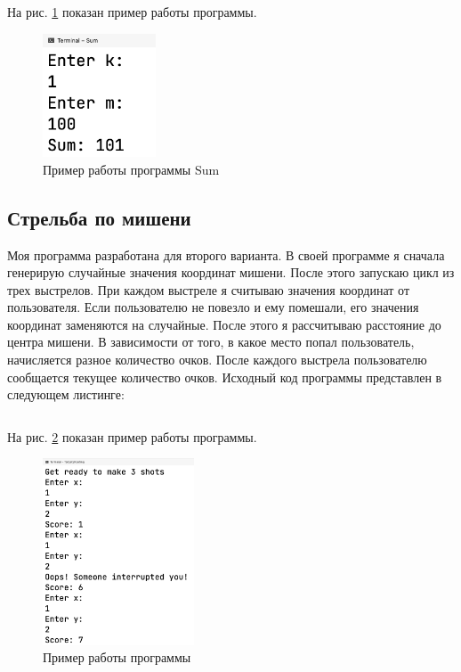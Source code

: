 \documentclass[a4paper,14pt]{extarticle}
\numberwithin{figure}{section}
\begin{document}
На рис. \ref{fig:task-5} показан пример работы программы.

\begin{figure}[H]
    \centering
    \includegraphics[width=0.3\textwidth]{images/task-5.png}
    \caption{Пример работы программы Sum}
    \label{fig:task-5}
\end{figure}

\subsection{Стрельба по мишени}

Моя программа разработана для второго варианта. В своей программе я сначала генерирую случайные значения координат мишени. После этого запускаю цикл из трех выстрелов. При каждом выстреле я считываю значения координат от пользователя. Если пользователю не повезло и ему помешали, его значения координат заменяются на случайные. После этого я рассчитываю расстояние до центра мишени. В зависимости от того, в какое место попал пользователь, начисляется разное количество очков. После каждого выстрела пользователю сообщается текущее количество очков. Исходный код программы представлен в следующем листинге:

\inputminted{csharp}{../TargetShooting/TargetShooting/Program.cs}

На рис. \ref{fig:task-6} показан пример работы программы.

\begin{figure}[H]
    \centering
    \includegraphics[width=0.4\textwidth]{images/task-6.png}
    \caption{Пример работы программы}
    \label{fig:task-6}
\end{figure}
\end{document}
